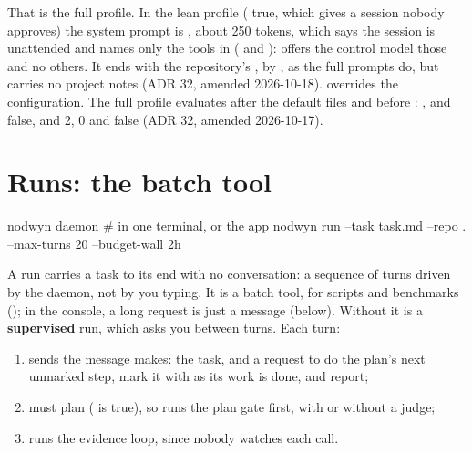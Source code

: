 That is the full profile. In the lean profile ( true,
which  gives a session nobody approves) the
system prompt is , about 250 tokens, which says
the session is unattended and names only the tools in 
( and ):  offers the control
model those and no others. It ends with the repository's ,
by , as the full prompts do, but carries
no project notes (ADR 32, amended 2026-10-18). 
overrides the configuration.
The full profile evaluates  after the default files and before
: , 
and  false,  and
 2,  0 and
 false (ADR 32, amended 2026-10-17).

\section{Runs: the batch tool}

\begin{sh}
nodwyn daemon                       # in one terminal, or the app
nodwyn run --task task.md --repo . --max-turns 20 --budget-wall 2h
\end{sh}

A run carries a task to its end with no conversation: a sequence of turns
driven by the daemon, not by you typing. It is a batch tool, for scripts
and benchmarks (); in the console, a long request is
just a message (below). Without  it is a
\textbf{supervised} run, which asks you between turns. Each turn:

\begin{enumerate}
  \item sends the message  makes: the task, and a request to do the plan's next
    unmarked step, mark it with  as its work is done, and
    report;
  \item must plan ( is true), so 
    runs the plan gate first, with or without a judge;
  \item runs the evidence loop, since nobody watches each call.
\end{enumerate}


